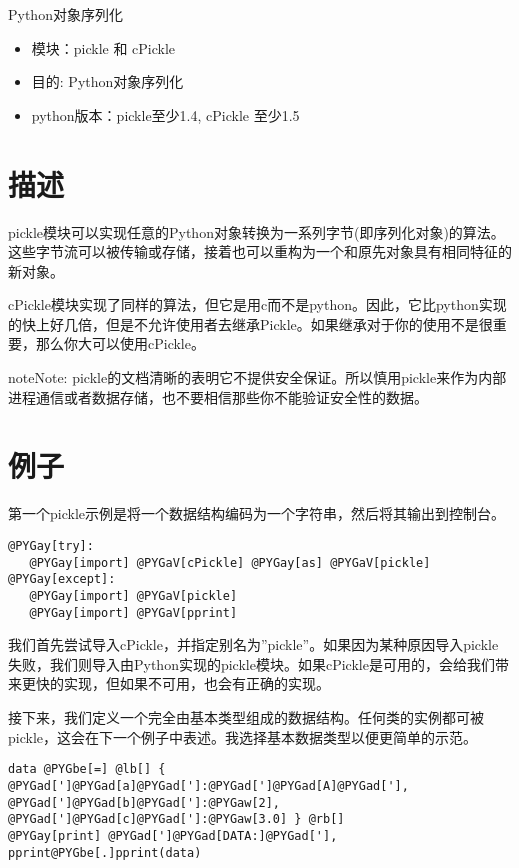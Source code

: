 \documentclass[a4paper,10pt,english]{manual}
\begin{document}
Python对象序列化
\begin{itemize}
\item {} 
模块：pickle 和 cPickle

\item {} 
目的: Python对象序列化

\item {} 
python版本：pickle至少1.4, cPickle 至少1.5

\end{itemize}


\section{描述}

pickle模块可以实现任意的Python对象转换为一系列字节(即序列化对象)的算法。这些字节流可以被传输或存储，接着也可以重构为一个和原先对象具有相同特征的新对象。

cPickle模块实现了同样的算法，但它是用c而不是python。因此，它比python实现的快上好几倍，但是不允许使用者去继承Pickle。如果继承对于你的使用不是很重要，那么你大可以使用cPickle。

\begin{notice}{note}{Note:}
pickle的文档清晰的表明它不提供安全保证。所以慎用pickle来作为内部进程通信或者数据存储，也不要相信那些你不能验证安全性的数据。
\end{notice}


\section{例子}

第一个pickle示例是将一个数据结构编码为一个字符串，然后将其输出到控制台。

\begin{Verbatim}[commandchars=@\[\]]
@PYGay[try]:
   @PYGay[import] @PYGaV[cPickle] @PYGay[as] @PYGaV[pickle]
@PYGay[except]:
   @PYGay[import] @PYGaV[pickle]
   @PYGay[import] @PYGaV[pprint]
\end{Verbatim}

我们首先尝试导入cPickle，并指定别名为''pickle''。如果因为某种原因导入pickle失败，我们则导入由Python实现的pickle模块。如果cPickle是可用的，会给我们带来更快的实现，但如果不可用，也会有正确的实现。

接下来，我们定义一个完全由基本类型组成的数据结构。任何类的实例都可被pickle，这会在下一个例子中表述。我选择基本数据类型以便更简单的示范。

\begin{Verbatim}[commandchars=@\[\]]
data @PYGbe[=] @lb[] { @PYGad[']@PYGad[a]@PYGad[']:@PYGad[']@PYGad[A]@PYGad['], @PYGad[']@PYGad[b]@PYGad[']:@PYGaw[2], @PYGad[']@PYGad[c]@PYGad[']:@PYGaw[3.0] } @rb[]
@PYGay[print] @PYGad[']@PYGad[DATA:]@PYGad['],
pprint@PYGbe[.]pprint(data)
\end{Verbatim}
\end{document}
